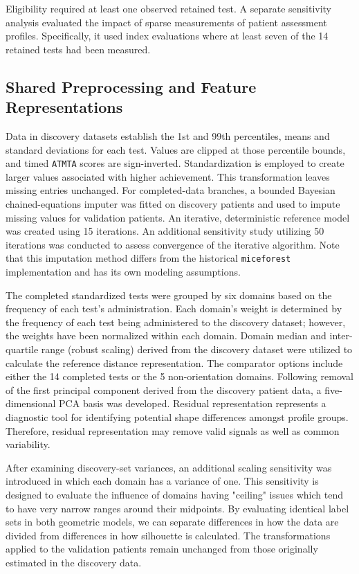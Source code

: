 Eligibility required at least one observed retained test. A separate sensitivity analysis evaluated the impact of sparse measurements of patient assessment profiles. Specifically, it used index evaluations where at least seven of the 14 retained tests had been measured.

\subsection{Shared Preprocessing and Feature Representations}

Data in discovery datasets establish the 1st and 99th percentiles, means and standard deviations for each test. Values are clipped at those percentile bounds, and timed \texttt{ATMTA} scores are sign-inverted. Standardization is employed to create larger values associated with higher achievement. This transformation leaves missing entries unchanged. For completed-data branches, a bounded Bayesian chained-equations imputer was fitted on discovery patients and used to impute missing values for validation patients. An iterative, deterministic reference model was created using 15 iterations. An additional sensitivity study utilizing 50 iterations was conducted to assess convergence of the iterative algorithm. Note that this imputation method differs from the historical \texttt{miceforest} implementation and has its own modeling assumptions.

The completed standardized tests were grouped by six domains based on the frequency of each test's administration. Each domain's weight is determined by the frequency of each test being administered to the discovery dataset; however, the weights have been normalized within each domain. Domain median and inter-quartile range (robust scaling) derived from the discovery dataset were utilized to calculate the reference distance representation. The comparator options include either the 14 completed tests or the 5 non-orientation domains. Following removal of the first principal component derived from the discovery patient data, a five-dimensional PCA basis was developed. Residual representation represents a diagnostic tool for identifying potential shape differences amongst profile groups. Therefore, residual representation may remove valid signals as well as common variability.

After examining discovery-set variances, an additional scaling sensitivity was introduced in which each domain has a variance of one. This sensitivity is designed to evaluate the influence of domains having "ceiling" issues which tend to have very narrow ranges around their midpoints. By evaluating identical label sets in both geometric models, we can separate differences in how the data are divided from differences in how silhouette is calculated. The transformations applied to the validation patients remain unchanged from those originally estimated in the discovery data.

